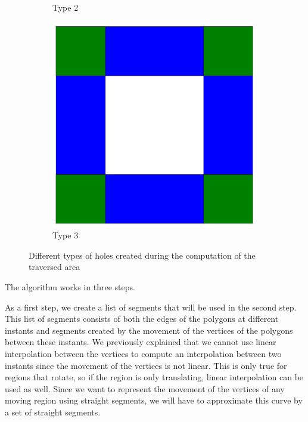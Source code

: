 \begin{figure}[h!]
\begin{subfigure}{.3\textwidth}
        \caption{Type 2}
        \label{fig:hole_type_2}
    \end{subfigure}
    \hfill
    \begin{subfigure}{.3\textwidth}
        \centering
        \includegraphics[width=\textwidth]{images/hole_3.pdf}
        \caption{Type 3}
        \label{fig:hole_type_3}
    \end{subfigure}
    \caption{Different types of holes created during the computation of the traversed area}
    \label{fig:hole_types}
\end{figure}

The algorithm works in three steps.

As a first step, we create a list of segments that will be used in the second step. This list of segments consists of both the edges of the polygons at different instants and segments created by the movement of the vertices of the polygons between these instants. We previously explained that we cannot use linear interpolation between the vertices to compute an interpolation between two instants since the movement of the vertices is not linear. This is only true for regions that rotate, so if the region is only translating, linear interpolation can be used as well. Since we want to represent the movement of the vertices of any moving region using straight segments, we will have to approximate this curve by a set of straight segments. 

